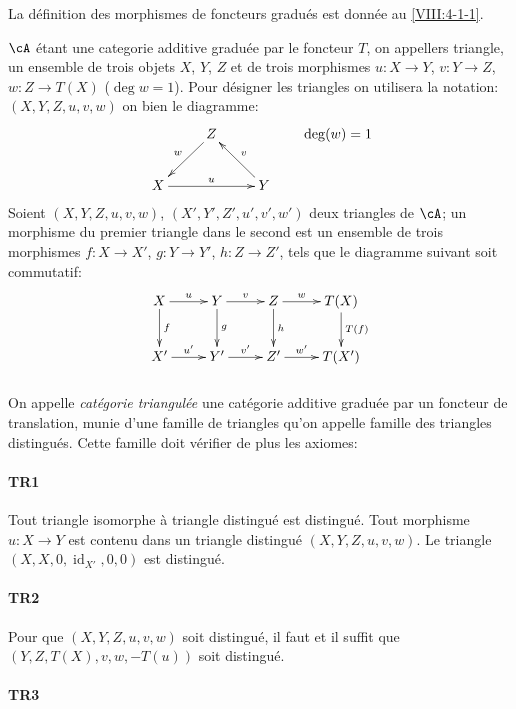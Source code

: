 La définition des morphismes de foncteurs gradués est donnée au 
\ref{VIII:4-1-1}. 

$\cA$ étant une categorie additive graduée par le foncteur $T$, on 
appellers triangle, un ensemble de trois objets $X$, $Y$, $Z$ et de trois 
morphismes $u:X\to Y$, $v:Y\to Z$, $w:Z\to T(X)$ ($\deg w=1$). Pour désigner 
les triangles on utilisera la notation: $(X,Y,Z,u,v,w)$ on bien le diagramme: 
\[\xymatrix{
  & Z \ar[dl]_-w \\
  X \ar[rr]^-u 
    & & Y \ar[lu]_-v 
}\qquad \deg(w)=1
\]
Soient $(X,Y,Z,u,v,w)$, $(X',Y',Z',u',v',w')$ deux triangles de $\cA$; un 
morphisme du premier triangle dans le second est un ensemble de trois 
morphismes $f:X\to X'$, $g:Y\to Y'$, $h:Z\to Z'$, tels que le diagramme 
suivant soit commutatif: 
\[\xymatrix{
  X \ar[r]^-u \ar[d]^-f 
    & Y \ar[r]^-v \ar[d]^-g 
    & Z \ar[r]^-w \ar[d]^-h 
    & T(X) \ar[d]^-{T(f)} \\
  X' \ar[r]^-{u'} 
    & Y' \ar[r]^-{v'} 
    & Z' \ar[r]^-{w'} 
    & T(X') 
}\]





\subsubsection{}\label{VIII:1-1-1}

On appelle \emph{catégorie triangulée} une catégorie additive graduée 
par un foncteur de translation, munie d'une famille de triangles qu'on appelle 
famille des triangles distingués. Cette famille doit vérifier de plus les 
axiomes: 


\paragraph*{TR1}
\label{VIII:TR1}

Tout triangle isomorphe à triangle distingué est distingué. Tout 
morphisme $u:X\to Y$ est contenu dans un triangle distingué 
$(X,Y,Z,u,v,w)$. Le triangle $(X,X,0,\operatorname{id}_{X'},0,0)$ est 
distingué. 


\paragraph*{TR2}
\label{VIII:TR2}

Pour que $(X,Y,Z,u,v,w)$ soit distingué, il faut et il suffit que 
$(Y,Z,T(X),v,w,-T(u))$ soit distingué. 


\paragraph*{TR3}
\label{VIII:TR3}

